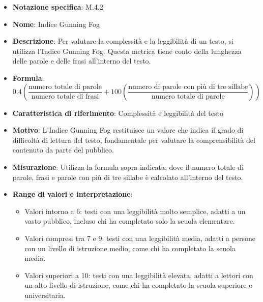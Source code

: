 \begin{itemize}
    \item \textbf{Notazione specifica}: M.4.2
    \item \textbf{Nome}: Indice Gunning Fog
    \item \textbf{Descrizione}: Per valutare la complessità e la leggibilità di un testo, si utilizza l'Indice Gunning Fog. Questa metrica tiene conto della lunghezza delle parole e delle frasi all'interno del testo.
    \item \textbf{Formula}:
    \[ 0.4 \left( \frac{{\text{{numero totale di parole}}}}{{\text{{numero totale di frasi}}}} + 100 \left( \frac{{\text{{numero di parole con più di tre sillabe}}}}{{\text{{numero totale di parole}}}} \right) \right) \]
    \item \textbf{Caratteristica di riferimento}: Complessità e leggibilità del testo
    \item \textbf{Motivo}: L'Indice Gunning Fog restituisce un valore che indica il grado di difficoltà di lettura del testo, fondamentale per valutare la comprensibilità del contenuto da parte del pubblico.
    \item \textbf{Misurazione}: Utilizza la formula sopra indicata, dove il numero totale di parole, frasi e parole con più di tre sillabe è calcolato all'interno del testo.
    \item \textbf{Range di valori e interpretazione}: 
    \begin{itemize}
        \item Valori intorno a 6: testi con una leggibilità molto semplice, adatti a un vasto pubblico, incluso chi ha completato solo la scuola elementare.
        \item Valori compresi tra 7 e 9: testi con una leggibilità media, adatti a persone con un livello di istruzione medio, come chi ha completato la scuola media.
        \item Valori superiori a 10: testi con una leggibilità elevata, adatti a lettori con un alto livello di istruzione, come chi ha completato la scuola superiore o universitaria.
    \end{itemize}
\end{itemize}
